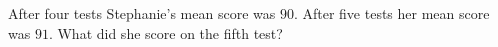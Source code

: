 After four tests Stephanie's mean score was $90$. After five tests her mean score was $91$. What did she score on the fifth test?

